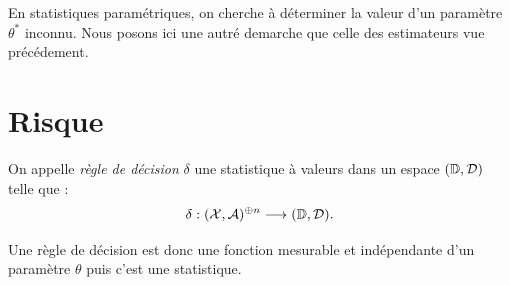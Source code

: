\minitoc 



En statistiques paramétriques, on cherche à déterminer la valeur d'un paramètre 
$ \theta^*$ inconnu. Nous posons ici une autré demarche que celle des estimateurs vue 
précédement. 


\section{Risque}

\begin{definition}
    On appelle \emph{règle de décision} $ \delta$ une statistique à valeurs dans un
    espace $(\mathbb{D}, \mathcal{D})$ telle que : 
        $$ \delta : ( \mathcal{X}, \mathcal{A})^{\oplus n} \longrightarrow (\mathbb{D}, \mathcal{D}). $$ 
\end{definition}

\begin{remark}
    Une règle de décision est donc une fonction mesurable et indépendante d'un paramètre $ \theta$ puis 
    c'est une statistique. 
\end{remark}

